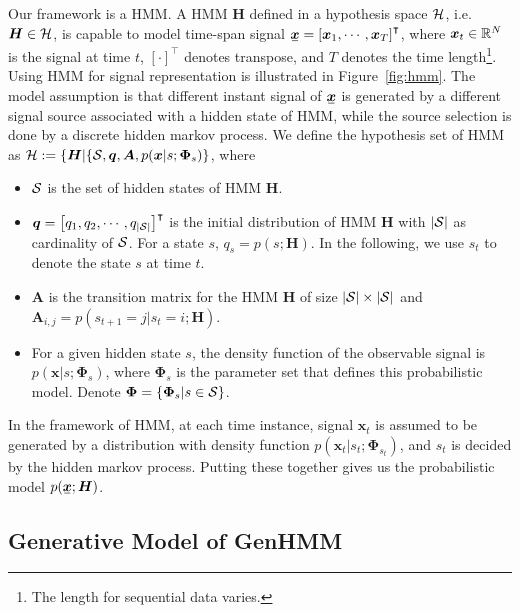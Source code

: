 \documentclass[letterpaper]{article} %
\newcommand{\ubar}[1]{\mkern2mu\underline{\mkern-2mu #1\mkern-2mu}\mkern2mu}
\newcommand{\ubm}[1]{\ubar{\bm{#1}}}
\begin{document}
Our framework is a HMM. A HMM $\bm{H}$ defined in a hypothesis space $\mathcal{H}$, i.e. $\bm{H} \in \mathcal{H}$, is capable to model time-span signal $\ubar{\bm{x}} = \left[ \bm{x}_1, \cdots, \bm{x}_T\right]^{\intercal}$, where $\bm{x}_t\in \mathbb{R}^{N}$ is the signal at time $t$, $[\cdot]^{\intercal}$ denotes transpose, and $T$ denotes the time length\footnote{The length for  sequential data varies.}. Using HMM for signal representation is illustrated in Figure~\ref{fig:hmm}. The model assumption is that different instant signal of $\ubar{\bm{x}}$ is generated by a different signal source associated with a hidden state of HMM, while the source selection is done by a discrete hidden markov process. We define the hypothesis set of HMM as $\mathcal{H} := \{\bm{H} | \{\mathcal{S}, \bm{q}, \bm{A}, p(\bm{x}|{s}; \bm{\Phi}_{s})\}$, where
\begin{itemize}
\item $\mathcal{S}$ is the set of hidden states of HMM $\bm{H}$.
\item $\bm{q} = \left[ q_1, q_2, \cdots, q_{|\mathcal{S}|}\right]^\intercal$ is the initial distribution of HMM $\bm{H}$ with $|\mathcal{S}|$ as cardinality of $\mathcal{S}$. For a state $s$, $q_s = p(s;\bm{H})$. In the following, we use $s_t$ to denote the state $s$ at time $t$.
\item $\bm{A}$ is the transition matrix for the HMM $\bm{H}$ of size $|\mathcal{S}| \times |\mathcal{S}|$ and $\bm{A}_{i,j} = p(s_{t+1}=j|s_{t}=i; \bm{H})$.
\item For a given hidden state $s$, the density function of the observable signal is $p({\bm{x}}|{s};\bm{\Phi}_{s})$, where $\bm{\Phi}_{s}$ is the parameter set that defines this probabilistic model. Denote $\bm{\Phi} = \left\{ \bm{\Phi}_{s}| s \in \mathcal{S} \right\}$.
\end{itemize}

In the framework of HMM, at each time instance, signal $\bm{x}_t$ is assumed to be generated by a distribution with density function $p(\bm{x}_t| s_t; \bm{\Phi}_{s_t})$, and $s_t$ is decided by the hidden markov process. Putting these together gives us the probabilistic model $p(\ubm{x};\bm{H})$.

\subsection{Generative Model of GenHMM}
\end{document}
